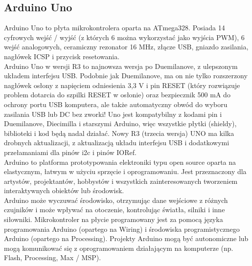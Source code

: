 \documentclass{classrep}
\begin{document}
\subsection {Arduino Uno}
Arduino Uno to płyta mikrokontrolera oparta na ATmega328. Posiada 14 cyfrowych wejść / wyjść (z których 6 można wykorzystać jako wyjścia PWM), 6 wejść analogowych, ceramiczny rezonator 16 MHz, złącze USB, gniazdo zasilania, nagłówek ICSP i przycisk resetowania.\\

Arduino Uno w wersji R3 to najnowsza wersja po Duemilanove, z ulepszonym układem interfejsu USB. Podobnie jak Duemilanove, ma on nie tylko rozszerzony nagłówek osłony z napięciem odniesienia 3,3 V i pin RESET (który rozwiązuje problem dotarcia do szpilki RESET w osłonie) oraz bezpiecznik 500 mA do ochrony portu USB komputera, ale także automatyczny obwód do wyboru zasilania USB lub DC bez zworki! Uno jest kompatybilny z kodami pin i Duemilanove, Diecimilla i starszymi Arduino, więc wszystkie płytki (shieldy), biblioteki i kod będą nadal działać. Nowy R3 (trzecia wersja) UNO ma kilka drobnych aktualizacji, z aktualizacją układu interfejsu USB i dodatkowymi przełamaniami dla pinów i2c i pinów IORef.\\

Arduino to platforma prototypowania elektroniki typu open source oparta na elastycznym, łatwym w użyciu sprzęcie i oprogramowaniu. Jest przeznaczony dla artystów, projektantów, hobbystów i wszystkich zainteresowanych tworzeniem interaktywnych obiektów lub środowisk.\\

Arduino może wyczuwać środowisko, otrzymując dane wejściowe z różnych czujników i może wpływać na otoczenie, kontrolując światła, silniki i inne siłowniki. Mikrokontroler na płycie programowany jest za pomocą języka programowania Arduino (opartego na Wiring) i środowiska programistycznego Arduino (opartego na Processing). Projekty Arduino mogą być autonomiczne lub mogą komunikować się z oprogramowaniem działającym na komputerze (np. Flash, Processing, Max / MSP).\\
\end{document}
